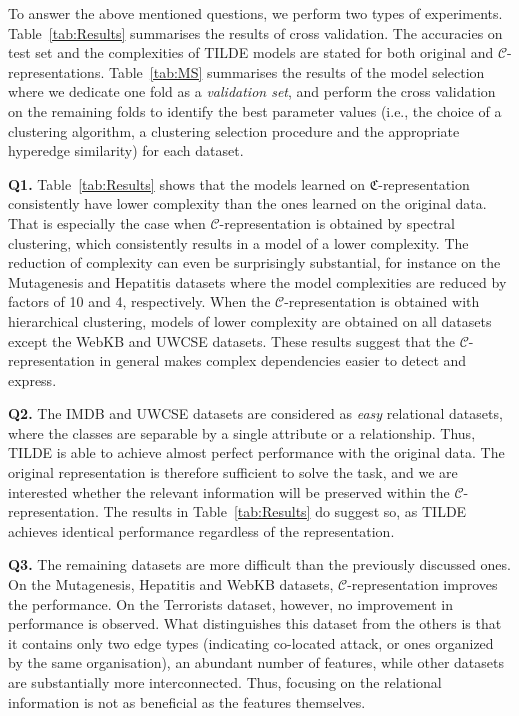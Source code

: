 To answer the above mentioned questions, we perform two types of experiments.
Table~\ref{tab:Results} summarises the results of cross validation.
The accuracies on test set and the complexities of TILDE models are stated for both original and $\mathcal{C}$-representations.
Table~\ref{tab:MS} summarises the results of the model selection where we dedicate one fold as a \textit{validation set}, and perform the cross validation on the remaining folds to identify the best parameter values (i.e., the choice of a clustering algorithm, a clustering selection procedure and the appropriate hyperedge similarity) for each dataset.

\textbf{Q1.}
Table~\ref{tab:Results} shows that the models learned on $\mathfrak{C}$-representation consistently have lower complexity than the ones learned on the original data.
That is especially the case when $\mathcal{C}$-representation is obtained by spectral clustering, which consistently results in a model of a lower complexity.
The reduction of complexity can even be surprisingly substantial, for instance on the Mutagenesis and Hepatitis datasets where the model complexities are reduced by factors of 10 and 4, respectively.
When the $\mathcal{C}$-representation is obtained with hierarchical clustering, models of lower complexity are obtained on all datasets except the WebKB and UWCSE datasets.
These results suggest that the $\mathcal{C}$-representation in general makes complex dependencies easier to detect and express.




\textbf{Q2.}
The IMDB and UWCSE datasets are considered as \textit{easy} relational datasets, where the classes are separable by a single attribute or a relationship.
Thus, TILDE is able to achieve almost perfect performance  with the original data.
The original representation is therefore sufficient to solve the task, and we are interested whether  the relevant information will be preserved within the $\mathcal{C}$-representation.
The results in Table~\ref{tab:Results} do suggest so, as TILDE achieves identical performance regardless of the representation.



\textbf{Q3.}
The remaining datasets are more difficult than the previously discussed ones.
On the Mutagenesis, Hepatitis and WebKB datasets, $\mathcal{C}$-representation improves the performance.
On the Terrorists dataset, however, no improvement in performance is observed.
What distinguishes this dataset from the others is that it contains only two edge types (indicating co-located attack, or ones organized by the same organisation), an abundant number of features, while other datasets are substantially more interconnected.
Thus, focusing on the relational information is not as beneficial as the features themselves. 

